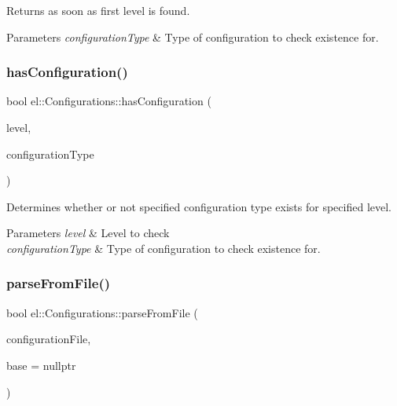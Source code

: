 Returns as soon as first level is found. 
\begin{DoxyParams}{Parameters}
{\em configuration\+Type} & Type of configuration to check existence for. \\
\hline
\end{DoxyParams}
\mbox{\label{classel_1_1_configurations_a5313557efac3b0c78f973a5a1d685277}} 
\subsubsection{\texorpdfstring{has\+Configuration()}{hasConfiguration()}\hspace{0.1cm}{\footnotesize\ttfamily [2/2]}}
{\footnotesize\ttfamily bool el\+::\+Configurations\+::has\+Configuration (\begin{DoxyParamCaption}\item[{\hyperlink{namespaceel_ab0ac6091262344c52dd2d3ad099e8e36}{Level}}]{level,  }\item[{\hyperlink{namespaceel_a281f5db6d6163678bc68a8b23b59e124}{Configuration\+Type}}]{configuration\+Type }\end{DoxyParamCaption})\hspace{0.3cm}{\ttfamily [inline]}}



Determines whether or not specified configuration type exists for specified level. 


\begin{DoxyParams}{Parameters}
{\em level} & Level to check \\
\hline
{\em configuration\+Type} & Type of configuration to check existence for. \\
\hline
\end{DoxyParams}
\mbox{\label{classel_1_1_configurations_aaa098126d64a5ee04a3944b1a65dcdca}} 
\subsubsection{\texorpdfstring{parse\+From\+File()}{parseFromFile()}}
{\footnotesize\ttfamily bool el\+::\+Configurations\+::parse\+From\+File (\begin{DoxyParamCaption}\item[{const std\+::string \&}]{configuration\+File,  }\item[{\hyperlink{classel_1_1_configurations}{Configurations} $\ast$}]{base = {\ttfamily nullptr} }\end{DoxyParamCaption})\hspace{0.3cm}{\ttfamily [inline]}}



